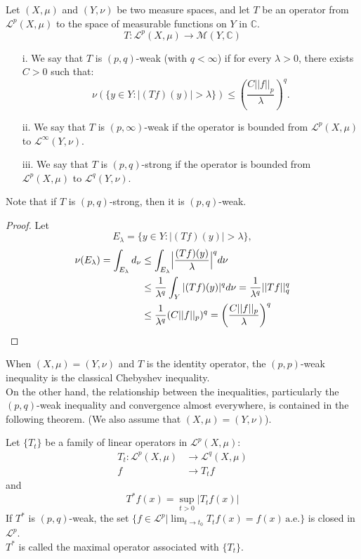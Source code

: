 \begin{definition}{}
    Let $(X,\mu)$ and $(Y, \nu)$ be two measure spaces, and let $T$ be an operator from $\mathcal{L}^{p}(X,\mu)$ to the space of measurable functions on $Y$ in $\mathbb{C}$.
    $$T:\mathcal{L}^p(X,\mu)\rightarrow\mathcal{M}(Y,\mathbb{C})$$
    \begin{itemize}
        \item[i.] We say that $T$ is $(p,q)$-weak (with $q<\infty$) if for every $\lambda>0$, there exists $C>0$ such that:
        $$\nu(\{y\in Y:|(Tf)(y)|>\lambda\})\leq \left(\frac{C||f||_p}{\lambda}\right)^q.$$
        \item[ii.] We say that $T$ is $(p,\infty)$-weak if the operator is bounded from $\mathcal{L}^p(X,\mu)$ to $\mathcal{L}^{\infty}(Y,\nu)$.
        \item[iii.] We say that $T$ is $(p,q)$-strong if the operator is bounded from $\mathcal{L}^p(X,\mu)$ to $\mathcal{L}^q(Y,\nu)$.
    \end{itemize}
\end{definition}
\begin{proposition}{}
  Note that if $T$ is $(p,q)$-strong, then it is $(p,q)$-weak.
\end{proposition}
\begin{proof}{}
  Let $$E_\lambda=\{ y\in Y: |(Tf)(y)|>\lambda \},$$
  \begin{align*}
    \nu(E_\lambda)=\int_{E_\lambda}d_{\nu}&\leq\int_{E_\lambda}\Bigl|\frac{(Tf)(y)}{\lambda}\Bigr|^qd\nu \\
    &\leq\frac{1}{\lambda^q}\int_{Y}|(Tf)(y)|^qd\nu=\frac{1}{\lambda^q}||Tf||_q^q\\
    &\leq \frac{1}{\lambda^q}(C||f||_p)^q=\left(\frac{C||f||_p}{\lambda}\right)^q
  \end{align*}  
\end{proof}
When $(X,\mu)=(Y,\nu)$ and $T$ is the identity operator, the $(p,p)$-weak inequality is the classical Chebyshev inequality.\\
On the other hand, the relationship between the inequalities, particularly the $(p,q)$-weak inequality and convergence almost everywhere, is contained in the following theorem. (We also assume that $(X,\mu)=(Y,\nu)$).\\
\begin{theorem}{}
  Let $\{T_t\}$ be a family of linear operators in $\mathcal{L}^p(X,\mu)$:
  \begin{align*}
    T_t:\mathcal{L}^p(X,\mu)&\rightarrow\mathcal{L}^q(X,\mu)\\
    f&\rightarrow T_tf
  \end{align*}
  and
  $$T^*f(x)=\sup_{t>0}|T_tf(x)|$$
  If $T^*$ is $(p,q)$-weak, the set $\{f\in\mathcal{L}^p|\lim_{t\rightarrow t_0} T_tf(x)=f(x)\, \text{a.e.}\}$ is closed in $\mathcal{L}^p$.\\
  $T^*$ is called the maximal operator associated with $\{T_t\}$.
\end{theorem}
